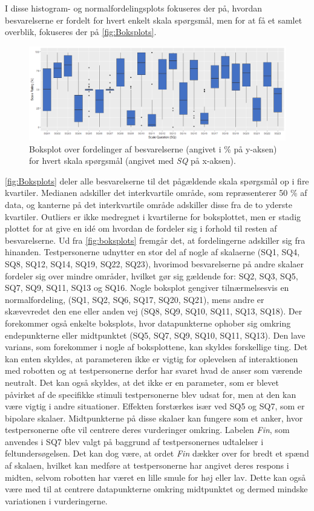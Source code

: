 \noindent
%
I disse histogram- og normalfordelingsplots fokuseres der på, hvordan besvarelserne er fordelt for hvert enkelt skala spørgsmål, men for at få et samlet overblik, fokuseres der på \autoref{fig:Boksplots}. 
%
\begin{figure}[H]
\centering
\includegraphics[width = \textwidth]{Figure/DatabehandlingSkalaer/BoksplotUden0er} 
\caption{Boksplot over fordelinger af besvarelserne (angivet i \% på y-aksen) for hvert skala spørgsmål (angivet med \textit{SQ} på x-aksen).}
\label{fig:Boksplots}
\end{figure}
\noindent
%
\autoref{fig:Boksplots} deler alle besvarelserne til det pågældende skala spørgsmål op i fire kvartiler. Medianen adskiller det interkvartile område, som repræsenterer 50 \% af data, og kanterne på det interkvartile område adskiller disse fra de to yderste kvartiler. Outliers er ikke medregnet i kvartilerne for boksplottet, men er stadig plottet for at give en idé om hvordan de fordeler sig i forhold til resten af besvarelserne. \blankline
%
Ud fra \autoref{fig:boksplots} fremgår det, at fordelingerne adskiller sig fra hinanden. Testpersonerne udnytter en stor del af nogle af skalaerne (SQ1, SQ4, SQ8, SQ12, SQ14, SQ19, SQ22, SQ23), hvorimod besvarelserne på andre skalaer fordeler sig over mindre områder, hvilket gør sig gældende for: SQ2, SQ3, SQ5, SQ7, SQ9, SQ11, SQ13 og SQ16. Nogle boksplot gengiver tilnærmelsesvis en normalfordeling, (SQ1, SQ2, SQ6, SQ17, SQ20, SQ21), mens andre er skævevredet den ene eller anden vej (SQ8, SQ9, SQ10, SQ11, SQ13, SQ18). Der forekommer også enkelte boksplots, hvor datapunkterne ophober sig omkring endepunkterne eller midtpunktet (SQ5, SQ7, SQ9, SQ10, SQ11, SQ13). \blankline
%
Den lave varians, som forekommer i nogle af boksplottene, kan skyldes forskellige ting. Det kan enten skyldes, at parameteren ikke er vigtig for oplevelsen af interaktionen med robotten og at testpersonerne derfor har svaret hvad de anser som værende neutralt. Det kan også skyldes, at det ikke er en parameter, som er blevet påvirket af de specifikke stimuli testpersonerne blev udsat for, men at den kan være vigtig i andre situationer. Effekten forstærkes især ved SQ5 og SQ7, som er bipolare skalaer. Midtpunkterne på disse skalaer kan fungere som et anker, hvor testpersonerne ofte vil centrere deres vurderinger omkring. Labelen \textit{Fin}, som anvendes i SQ7 blev valgt på baggrund af testpersonernes udtalelser i feltundersøgelsen. Det kan dog være, at ordet \textit{Fin} dækker over for bredt et spænd af skalaen, hvilket kan medføre at testpersonerne har angivet deres respons i midten, selvom robotten har været en lille smule for høj eller lav. Dette kan også være med til at centrere datapunkterne omkring midtpunktet og dermed mindske variationen i vurderingerne. \blankline
